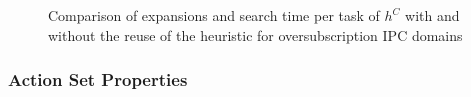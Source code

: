 \begin{figure}[ht]
	\scriptsize
	\begin{minipage}{0.5\textwidth}
		
	\end{minipage}
	\begin{minipage}{0.2\textwidth}
		
	\end{minipage}
	\hfill
	\begin{minipage}{0.2\textwidth}
		
	\end{minipage}
	\begin{minipage}{0.2\textwidth}
		
	\end{minipage}
	\hfill
	\begin{minipage}{0.2\textwidth}
		
	\end{minipage}

	\caption{Comparison of expansions and search time per task of $h^{C}$ with and 
	without the reuse of the heuristic for oversubscription IPC domains}
\end{figure}


\FloatBarrier
\newpage
\subsubsection*{Action Set Properties}

